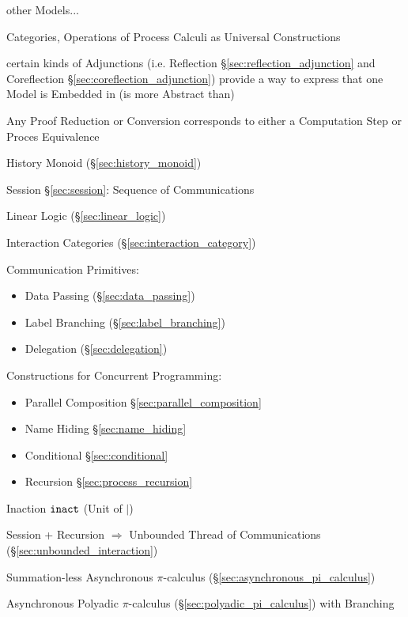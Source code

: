 other Models...

Categories, Operations of Process Calculi as Universal Constructions

certain kinds of Adjunctions (i.e. Reflection
\S\ref{sec:reflection_adjunction} and Coreflection
\S\ref{sec:coreflection_adjunction}) provide a way to express that one
Model is Embedded in (is more Abstract than)


\asterism


Any Proof Reduction or Conversion corresponds to either a Computation
Step or Proces Equivalence \cite{caires-pfenning10}

History Monoid (\S\ref{sec:history_monoid})

Session \S\ref{sec:session}: Sequence of Communications

Linear Logic (\S\ref{sec:linear_logic})

Interaction Categories (\S\ref{sec:interaction_category})


Communication Primitives:
\begin{itemize}
  \item Data Passing (\S\ref{sec:data_passing})
  \item Label Branching (\S\ref{sec:label_branching})
  \item Delegation (\S\ref{sec:delegation})
\end{itemize}


Constructions for Concurrent Programming:
\cite{honda-vasconcelos-kubo98}
\begin{itemize}
  \item Parallel Composition \S\ref{sec:parallel_composition}
  \item Name Hiding \S\ref{sec:name_hiding}
  \item Conditional \S\ref{sec:conditional}
  \item Recursion \S\ref{sec:process_recursion}
\end{itemize}

Inaction $\mathtt{inact}$ (Unit of $|$)


Session + Recursion $\Rightarrow$ Unbounded Thread of Communications
(\S\ref{sec:unbounded_interaction}) \cite{honda-vasconcelos-kubo98}

Summation-less Asynchronous $\pi$-calculus
(\S\ref{sec:asynchronous_pi_calculus}) \cite{honda-vasconcelos-kubo98}

Asynchronous Polyadic $\pi$-calculus
(\S\ref{sec:polyadic_pi_calculus}) with Branching
\cite{honda-vasconcelos-kubo98}

